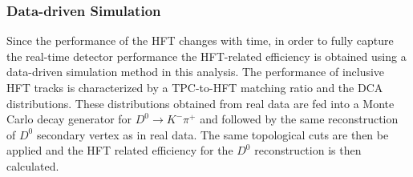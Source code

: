 \documentclass[%
 reprint,	
 amsmath,amssymb,
 aps,
 prc,
]{revtex4-1}
\begin{document}
\subsubsection{\label{sec:correction:hft:fastsim}Data-driven Simulation}

Since the performance of the HFT changes with time, in order to fully capture the real-time detector performance the HFT-related efficiency is obtained using a data-driven simulation method in this analysis. The performance of inclusive HFT tracks is characterized by a TPC-to-HFT matching ratio and the DCA distributions. These distributions obtained from real data are fed into a Monte Carlo decay generator for $D^0\rightarrow K^-\pi^+$ and followed by the same reconstruction of $D^0$ secondary vertex as in real data. The same topological cuts are then be applied and the HFT related efficiency for the $D^0$ reconstruction is then calculated.



\end{document}
